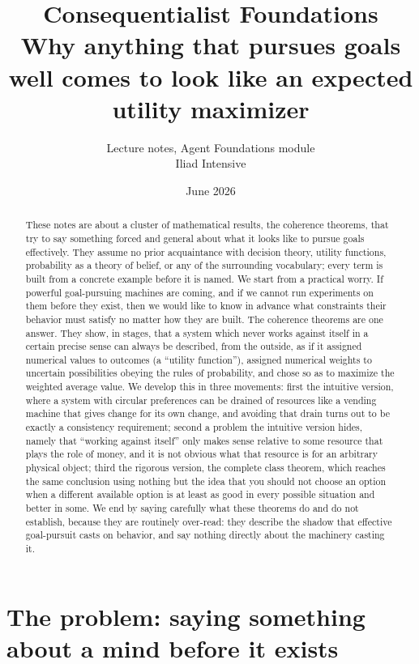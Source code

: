 \documentclass[10pt]{article}
\title{Consequentialist Foundations \\[1ex]
{\large Why anything that pursues goals well comes to look like an expected utility maximizer}}
\author{Lecture notes, Agent Foundations module \\ Iliad Intensive}
\date{June 2026}
\theoremstyle{definition}
\theoremstyle{remark}
\begin{document}
\maketitle

\begin{abstract}
These notes are about a cluster of mathematical results, the coherence theorems, that try to say something forced and general about what it looks like to pursue goals effectively. They assume no prior acquaintance with decision theory, utility functions, probability as a theory of belief, or any of the surrounding vocabulary; every term is built from a concrete example before it is named. We start from a practical worry. If powerful goal-pursuing machines are coming, and if we cannot run experiments on them before they exist, then we would like to know in advance what constraints their behavior must satisfy no matter how they are built. The coherence theorems are one answer. They show, in stages, that a system which never works against itself in a certain precise sense can always be described, from the outside, as if it assigned numerical values to outcomes (a ``utility function''), assigned numerical weights to uncertain possibilities obeying the rules of probability, and chose so as to maximize the weighted average value. We develop this in three movements: first the intuitive version, where a system with circular preferences can be drained of resources like a vending machine that gives change for its own change, and avoiding that drain turns out to be exactly a consistency requirement; second a problem the intuitive version hides, namely that ``working against itself'' only makes sense relative to some resource that plays the role of money, and it is not obvious what that resource is for an arbitrary physical object; third the rigorous version, the complete class theorem, which reaches the same conclusion using nothing but the idea that you should not choose an option when a different available option is at least as good in every possible situation and better in some. We end by saying carefully what these theorems do and do not establish, because they are routinely over-read: they describe the shadow that effective goal-pursuit casts on behavior, and say nothing directly about the machinery casting it.
\end{abstract}

\tableofcontents

\section{The problem: saying something about a mind before it exists}
\label{sec:intro}
\end{document}
